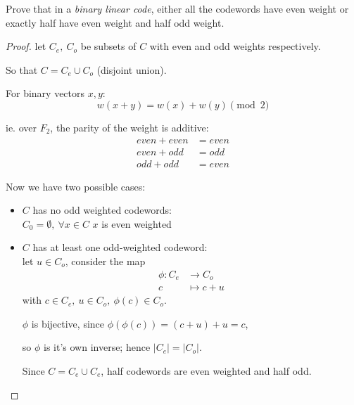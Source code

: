 \documentclass{article}
\theoremstyle{definition}
\newenvironment{ex}[1]
{\renewcommand\theinnerex{#1}\innerex}
{\endinnerex}
\begin{document}
\begin{ex}{5.5}
  Prove that in a \emph{binary linear code}, either all the codewords have even weight or exactly half have even weight and half odd weight.
\end{ex}
\begin{proof}
  let $C_e,~ C_o$ be subsets of $C$ with even and odd weights respectively.

  So that $C = C_e \cup C_o$ (disjoint union).

  For binary vectors $x,y$:
  $$w(x+y) = w(x) + w(y) \pmod 2$$

  ie. over $F_2$, the parity of the weight is additive:
  \begin{align*}
    even + even &= even\\
    even + odd &= odd\\
    odd + odd &= even
  \end{align*}

  Now we have two possible cases:
  \begin{itemize}
    \item $C$ has no odd weighted codewords:\\
      $C_0 = \emptyset,~ \forall x \in C$ $x$ is even weighted
    \item $C$ has at least one odd-weighted codeword:\\
      let $u \in C_o$, consider the map
      \begin{align*}
        \phi: C_e &\longrightarrow C_o\\
        c &\longmapsto c+u
      \end{align*}
      with $c \in C_e,~ u \in C_o,~ \phi(c) \in C_o$.

      $\phi$ is bijective, since $\phi(\phi(c))=(c+u)+u=c$,

      so $\phi$ is it's own inverse; hence $|C_e| = |C_o|$.

      Since $C=C_e \cup C_e$, half codewords are even weighted and half odd.
  \end{itemize}
\end{proof}
\end{document}
